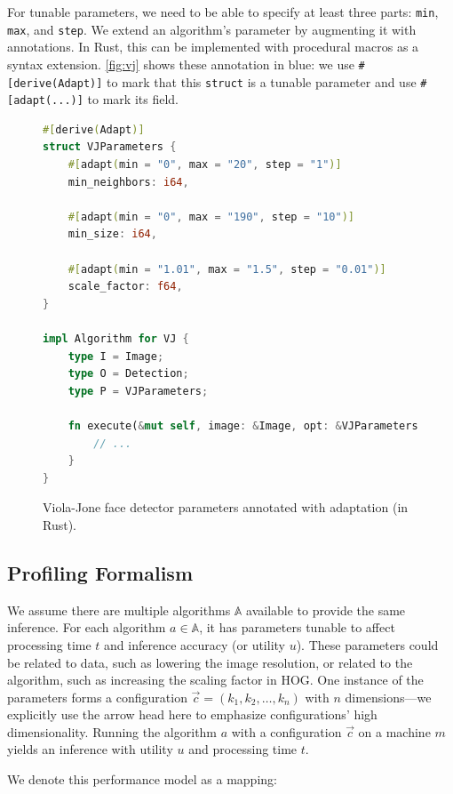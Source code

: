 For tunable parameters, we need to be able to specify at least three parts:
\texttt{min}, \texttt{max}, and \texttt{step}. We extend an algorithm's
parameter by augmenting it with annotations. In Rust, this can be implemented
with procedural macros as a syntax extension. \autoref{fig:vj} shows these
annotation in blue: we use \texttt{\#[derive(Adapt)]} to mark that this
\texttt{struct} is a tunable parameter and use \texttt{\#[adapt(...)]} to mark
its field.

\begin{figure}
  \centering
\begin{lstlisting}[language=Rust]
#[derive(Adapt)]
struct VJParameters {
    #[adapt(min = "0", max = "20", step = "1")]
    min_neighbors: i64,

    #[adapt(min = "0", max = "190", step = "10")]
    min_size: i64,

    #[adapt(min = "1.01", max = "1.5", step = "0.01")]
    scale_factor: f64,
}

impl Algorithm for VJ {
    type I = Image;
    type O = Detection;
    type P = VJParameters;

    fn execute(&mut self, image: &Image, opt: &VJParameters) -> Detection {
        // ...
    }
}
\end{lstlisting}
  \caption{Viola-Jone face detector parameters annotated with adaptation (in
    Rust).}
  \label{fig:vj}
\end{figure}

\subsection{Profiling Formalism}
\label{sec:profiling-formalism}

We assume there are multiple algorithms $\mathbb{A}$ available to provide the
same inference. For each algorithm $a \in \mathbb{A}$, it has parameters tunable
to affect processing time $t$ and inference accuracy (or utility $u$). These
parameters could be related to data, such as lowering the image resolution, or
related to the algorithm, such as increasing the scaling factor in HOG. One
instance of the parameters forms a configuration
$\vec{c} = (k_1, k_2, \dots, k_n)$ with $n$ dimensions---we explicitly use the
arrow head here to emphasize configurations' high dimensionality. Running the
algorithm $a$ with a configuration $\vec{c}$ on a machine $m$ yields an
inference with utility $u$ and processing time $t$.

We denote this performance model as a mapping:

